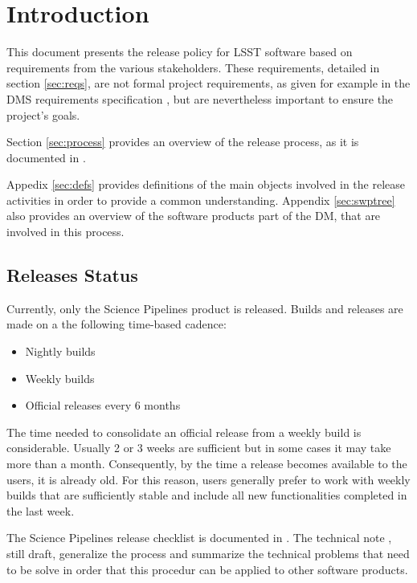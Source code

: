 \section{Introduction} \label{sec:intro}

This document presents the release policy for \gls{LSST} software based on requirements from the various stakeholders.
These requirements, detailed in section \ref{sec:reqs}, are not formal project requirements, as given for example in the \gls{DMS} requirements specification , but are nevertheless important to ensure the project's goals.

Section \ref{sec:process} provides an overview of the release process, as it is documented in .

Appedix \ref{sec:defs} provides definitions of the main objects involved in the release activities in order to provide a common understanding. 
Appendix \ref{sec:swptree} also provides an overview of the software products part of the \gls{DM}, that are involved in this process.


\subsection{Releases Status}\label{sec:sci}

Currently, only the Science Pipelines product is released. 
Builds and releases are made on a the following time-based cadence:

\begin{itemize}
\item Nightly builds
\item Weekly builds
\item Official releases every 6 months
\end{itemize}

The time needed to consolidate an official release from a weekly build is considerable.
Usually 2 or 3 weeks are sufficient but in some cases it may take more than a month. 
Consequently, by the time a release becomes available to the users, it is already old.
For this reason, users generally prefer to work with weekly builds that are sufficiently stable and include all new functionalities completed in the last week.

The Science Pipelines release checklist is documented in .
The technical note , still draft, generalize the process and summarize the technical problems that need to be solve in order that this procedur can be applied to other software products.

